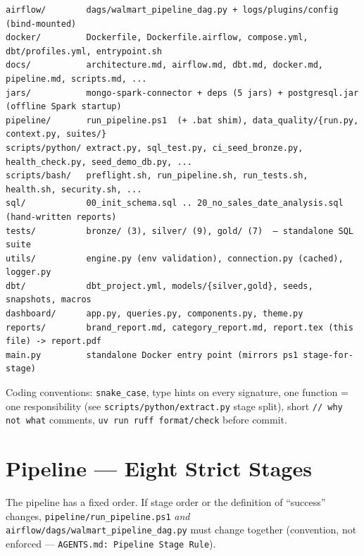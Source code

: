 \documentclass[11pt,a4paper]{article}
\begin{document}
\begin{lstlisting}[style=bash,caption={Top-level layout (trimmed). Mirrors \texttt{docs/architecture.md}.}]
airflow/        dags/walmart_pipeline_dag.py + logs/plugins/config (bind-mounted)
docker/         Dockerfile, Dockerfile.airflow, compose.yml, dbt/profiles.yml, entrypoint.sh
docs/           architecture.md, airflow.md, dbt.md, docker.md, pipeline.md, scripts.md, ...
jars/           mongo-spark-connector + deps (5 jars) + postgresql.jar (offline Spark startup)
pipeline/       run_pipeline.ps1  (+ .bat shim), data_quality/{run.py, context.py, suites/}
scripts/python/ extract.py, sql_test.py, ci_seed_bronze.py, health_check.py, seed_demo_db.py, ...
scripts/bash/   preflight.sh, run_pipeline.sh, run_tests.sh, health.sh, security.sh, ...
sql/            00_init_schema.sql .. 20_no_sales_date_analysis.sql (hand-written reports)
tests/          bronze/ (3), silver/ (9), gold/ (7)  — standalone SQL suite
utils/          engine.py (env validation), connection.py (cached), logger.py
dbt/            dbt_project.yml, models/{silver,gold}, seeds, snapshots, macros
dashboard/      app.py, queries.py, components.py, theme.py
reports/        brand_report.md, category_report.md, report.tex (this file) -> report.pdf
main.py         standalone Docker entry point (mirrors ps1 stage-for-stage)
\end{lstlisting}

Coding conventions: \texttt{snake\_case}, type hints on every signature, one function = one responsibility (see \texttt{scripts/python/extract.py} stage split), short \texttt{// why not what} comments, \texttt{uv run ruff format/check} before commit.

\section{Pipeline — Eight Strict Stages}

The pipeline has a fixed order. If stage order or the definition of ``success'' changes, \texttt{pipeline/run\_pipeline.ps1} \emph{and} \texttt{airflow/dags/walmart\_pipeline\_dag.py} must change together (convention, not enforced — \texttt{AGENTS.md: Pipeline Stage Rule}).
\end{document}
